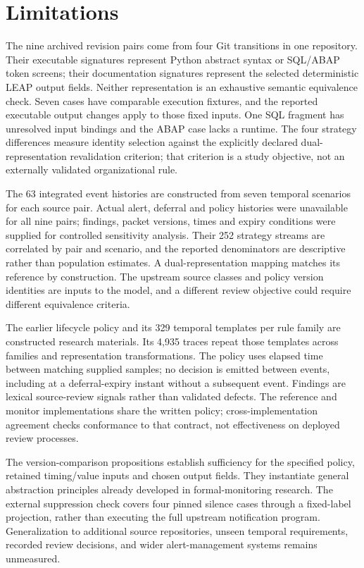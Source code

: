 \documentclass[preprint,11pt]{elsarticle}
\begin{document}
\section{Limitations}
The nine archived revision pairs come from four Git transitions in one repository. Their executable signatures represent Python abstract syntax or SQL/ABAP token screens; their documentation signatures represent the selected deterministic LEAP output fields. Neither representation is an exhaustive semantic equivalence check. Seven cases have comparable execution fixtures, and the reported executable output changes apply to those fixed inputs. One SQL fragment has unresolved input bindings and the ABAP case lacks a runtime. The four strategy differences measure identity selection against the explicitly declared dual-representation revalidation criterion; that criterion is a study objective, not an externally validated organizational rule.

The 63 integrated event histories are constructed from seven temporal scenarios for each source pair. Actual alert, deferral and policy histories were unavailable for all nine pairs; findings, packet versions, times and expiry conditions were supplied for controlled sensitivity analysis. Their 252 strategy streams are correlated by pair and scenario, and the reported denominators are descriptive rather than population estimates. A dual-representation mapping matches its reference by construction. The upstream source classes and policy version identities are inputs to the model, and a different review objective could require different equivalence criteria.

The earlier lifecycle policy and its 329 temporal templates per rule family are constructed research materials. Its 4,935 traces repeat those templates across families and representation transformations. The policy uses elapsed time between matching supplied samples; no decision is emitted between events, including at a deferral-expiry instant without a subsequent event. Findings are lexical source-review signals rather than validated defects. The reference and monitor implementations share the written policy; cross-implementation agreement checks conformance to that contract, not effectiveness on deployed review processes.

The version-comparison propositions establish sufficiency for the specified policy, retained timing/value inputs and chosen output fields. They instantiate general abstraction principles already developed in formal-monitoring research. The external suppression check covers four pinned silence cases through a fixed-label projection, rather than executing the full upstream notification program. Generalization to additional source repositories, unseen temporal requirements, recorded review decisions, and wider alert-management systems remains unmeasured.
\end{document}
